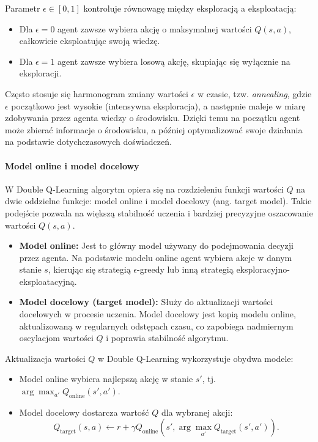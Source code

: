 Parametr \(\epsilon \in [0, 1]\) kontroluje równowagę między eksploracją a eksploatacją:
\begin{itemize}
	\item Dla \(\epsilon = 0\) agent zawsze wybiera akcję o maksymalnej wartości \(Q(s, a)\), całkowicie eksploatując swoją wiedzę.
	\item Dla \(\epsilon = 1\) agent zawsze wybiera losową akcję, skupiając się wyłącznie na eksploracji.
\end{itemize}

Często stosuje się harmonogram zmiany wartości \(\epsilon\) w czasie, tzw. \textit{annealing}, gdzie \(\epsilon\) początkowo jest wysokie (intensywna eksploracja), a następnie maleje w miarę zdobywania przez agenta wiedzy o środowisku. Dzięki temu na początku agent może zbierać informacje o środowisku, a później optymalizować swoje działania na podstawie dotychczasowych doświadczeń.

\paragraph{Model online i model docelowy}

W Double Q-Learning algorytm opiera się na rozdzieleniu funkcji wartości \(Q\) na dwie oddzielne funkcje: model online i model docelowy (ang. target model). Takie podejście pozwala na większą stabilność uczenia i bardziej precyzyjne oszacowanie wartości \(Q(s, a)\).

\begin{itemize}
	\item \textbf{Model online:} Jest to główny model używany do podejmowania decyzji przez agenta. Na podstawie modelu online agent wybiera akcje w danym stanie \(s\), kierując się strategią \( \epsilon\)-greedy lub inną strategią eksploracyjno-eksploatacyjną.
	\item \textbf{Model docelowy (target model):} Służy do aktualizacji wartości docelowych w procesie uczenia. Model docelowy jest kopią modelu online, aktualizowaną w regularnych odstępach czasu, co zapobiega nadmiernym oscylacjom wartości \(Q\) i poprawia stabilność algorytmu.
\end{itemize}

Aktualizacja wartości \(Q\) w Double Q-Learning wykorzystuje obydwa modele:
\begin{itemize}
	\item Model online wybiera najlepszą akcję w stanie \(s'\), tj. \(\arg\max_{a'} Q_\text{online}(s', a')\).
	\item Model docelowy dostarcza wartość \(Q\) dla wybranej akcji:
	      \begin{equation}Q_\text{target}(s, a) \leftarrow r + \gamma Q_\text{online}(s', \arg\max_{a'} Q_\text{target}(s', a')).\end{equation}
\end{itemize}

